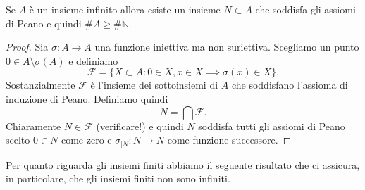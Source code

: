\documentclass[italian,a4paper,hidelinks,headinclude]{scrartcl}
\newcommand{\NN}{{\mathbb N}}
\begin{document}
\begin{theorem}\label{th:4994}
  Se $A$ è un insieme infinito allora esiste un insieme $N\subset A$
  che soddisfa
  gli assiomi di Peano e quindi $\#A \ge \#\NN$.
\end{theorem}
%
\begin{proof}
  Sia $\sigma\colon A \to A$ una funzione iniettiva ma non suriettiva.
  Scegliamo un punto $0\in A \setminus \sigma(A)$ e definiamo
  \[
    \mathcal F = \{ X\subset A\colon 0\in X, x\in X \implies \sigma(x)\in X\}.
  \]
  Sostanzialmente $\mathcal F$ è l'insieme dei sottoinsiemi di $A$ che soddisfano
  l'assioma di induzione di Peano.
  Definiamo quindi
  \[
    N = \bigcap \mathcal F.
  \]
  Chiaramente $N\in \mathcal F$ (verificare!) e quindi $N$ soddisfa tutti
  gli assiomi
  di Peano scelto $0\in N$  come zero e
  $\sigma_{|N}\colon N \to N$ come funzione successore.
\end{proof}

Per quanto riguarda gli insiemi finiti abbiamo il seguente risultato che ci
assicura, in particolare, che gli insiemi finiti non sono infiniti.
\end{document}

